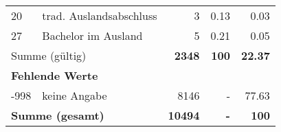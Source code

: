 \begin{longtable}{lXrrr}
     20 &
     \multicolumn{1}{X}{ trad. Auslandsabschluss   } &


       \num{3} &
       \num[round-mode=places,round-precision=2]{0,13} &
         \num[round-mode=places,round-precision=2]{0,03} \\

     27 &
     \multicolumn{1}{X}{ Bachelor im Ausland   } &


       \num{5} &
       \num[round-mode=places,round-precision=2]{0,21} &
         \num[round-mode=places,round-precision=2]{0,05} \\
     \midrule
     \multicolumn{2}{l}{Summe (gültig)} &
       \textbf{\num{2348}} &
     \textbf{100} &
       \textbf{\num[round-mode=places,round-precision=2]{22,37}} \\
     \multicolumn{5}{l}{\textbf{Fehlende Werte}}\\
       -998 &
       keine Angabe &
         \num{8146} &
        - &
         \num[round-mode=places,round-precision=2]{77,63} \\
     \midrule
     \multicolumn{2}{l}{\textbf{Summe (gesamt)}} &
          \textbf{\num{10494}} &
        \textbf{-} &
        \textbf{100} \\
     \bottomrule
     \end{longtable}
     
